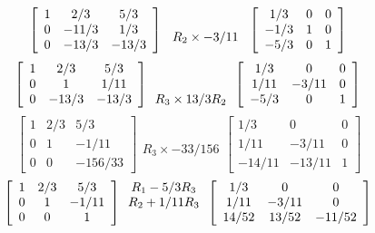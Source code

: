 \documentclass[a4paper, 12pt]{article}
\begin{document}
\[
\left[{
\begin{array}{ccc}
1 & 2/3 & 5/3 \\
0 & -11/3  & 1/3 \\
0 & -13/3 & -13/3 
\end{array}
}
\right]
\begin{array}{ccc}
\ \ \ \ \ \ \ \ \ \ \ \ \ \ \ \ \  \\
R_2 \times -3/11 \\ 
\end{array}
\left[{
\begin{array}{ccc}
1/3 & 0 & 0\\
-1/3 & 1 & 0\\
-5/3 & 0 & 1
\end{array} 
}
\right]\\ 
\] 
\[
\left[{
\begin{array}{ccc}
1 & 2/3 & 5/3 \\
0 & 1  & 1/11 \\
0 & -13/3 & -13/3 
\end{array}
}
\right]
\begin{array}{ccc}
\ \ \ \ \ \ \ \ \ \ \ \ \ \ \ \ \  \\
\ \ \ \ \ \ \ \ \ \ \ \ \ \ \ \ \  \\
R_3 \times 13/3R_2 \\ 
\end{array}
\left[{
\begin{array}{ccc}
1/3 & 0 & 0\\
1/11 & -3/11 & 0\\
-5/3 & 0 & 1
\end{array} 
}
\right]\\ 
\] 
\[
\left[{
\begin{array}{ccc}
1 & 2/3 & 5/3 \\
0 & 1  & -1/11 \\
0 & 0  & -156/33 
\end{array}
}
\right]
\begin{array}{ccc}
\ \ \ \ \ \ \ \ \ \ \ \ \ \ \ \ \  \\
\ \ \ \ \ \ \ \ \ \ \ \ \ \ \ \ \  \\
R_3 \times -33/156
\end{array}
\left[{
\begin{array}{ccc}
1/3 & 0 & 0\\
1/11 & -3/11 & 0\\
-14/11 & -13/11 & 1
\end{array} 
}
\right]
\] 
\[
\left[{
\begin{array}{ccc}
1 & 2/3 & 5/3 \\
0 & 1  & -1/11 \\
0 & 0  & 1
\end{array}
}
\right]
\begin{array}{ccc}
R_1 - 5/3 R_3  \\
R_2 + 1/11 R_3  \\
\ \ \ \ \ \ \ \ \ \ \ \ \ \ \ \ \  
\end{array}
\left[{
\begin{array}{ccc}
1/3 & 0 & 0\\
1/11 & -3/11 & 0\\
14/52 & 13/52 & -11/52
\end{array} 
}
\right]\\ 
\] 
\end{document}
